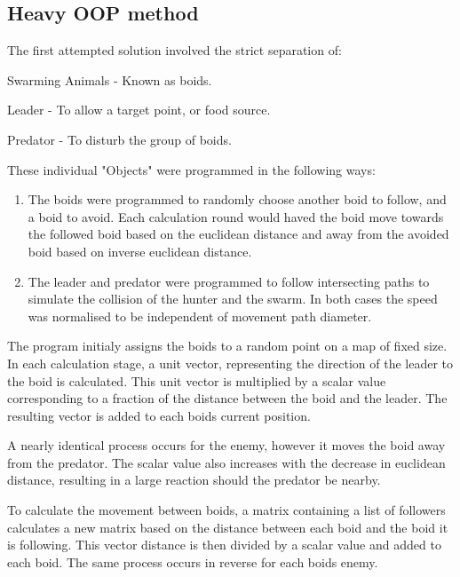 \documentclass[
reprint,
showpacs,preprintnumbers,
amsmath,amssymb,
prl,
]{revtex4-1}
\begin{document}
\subsection{\label{sec:level2}Heavy OOP method}

The first attempted solution involved the strict separation of:
\begin{description}
	\item{Swarming Animals - Known as boids.}
	\item{Leader - To allow a target point, or food source.}
	\item{Predator - To disturb the group of boids.}
\end{description}

These individual "Objects" were programmed in the following ways:
\begin{enumerate}
	\item{
		The boids were programmed to randomly choose another boid to follow, and a boid to avoid.
		Each calculation round would haved the boid move towards the followed boid based on the euclidean distance and away from the avoided boid based on inverse euclidean distance.
 }
 	\item{
		The leader and predator were programmed to follow intersecting paths to simulate the collision of the hunter and the swarm.
		In both cases the speed was normalised to be independent of movement path diameter.
	}
\end{enumerate}

The program initialy assigns the boids to a random point on a map of fixed size.
In each calculation stage, a unit vector, representing the direction of the leader to the boid is calculated.
This unit vector is multiplied by a scalar value corresponding to a fraction of the distance between the boid and the leader.
The resulting vector is added to each boids current position.

A nearly identical process occurs for the enemy, however it moves the boid away from the predator.
The scalar value also increases with the decrease in euclidean distance, resulting in a large reaction should the predator be nearby.

To calculate the movement between boids, a matrix containing a list of followers calculates a new matrix based on the distance between each boid and the boid it is following.
This vector distance is then divided by a scalar value and added to each boid.
The same process occurs in reverse for each boids enemy.
\end{document}
